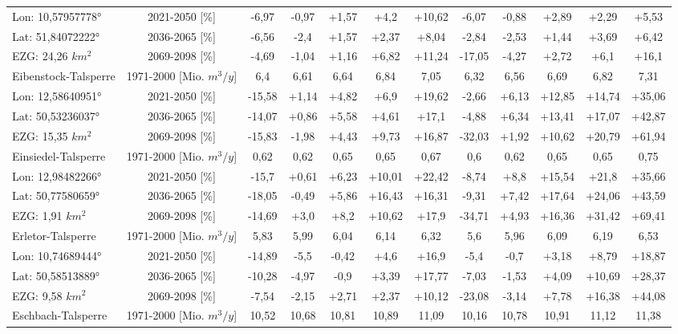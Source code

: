 \begin{longtable}{@{\extracolsep{\fill}}lc|ccccc||ccccc}
\cline{2-12} 
Lon: 10,57957778° & 2021-2050 [\%]  & -6,97 & -0,97 & +1,57 & +4,2 & +10,62 & -6,07 & -0,88 & +2,89 & +2,29 & +5,53\\ 
Lat: 51,84072222° & 2036-2065 [\%]  & -6,56 & -2,4 & +1,57 & +2,37 & +8,04 & -2,84 & -2,53 & +1,44 & +3,69 & +6,42\\ 
EZG: 24,26 $km^2$ & 2069-2098 [\%]  & -4,69 & -1,04 & +1,16 & +6,82 & +11,24 & -17,05 & -4,27 & +2,72 & +6,1 & +16,1\\ 
\hline 
Eibenstock-Talsperre & 1971-2000 [Mio. $m^3/y$]  & 6,4 & 6,61 & 6,64 & 6,84 & 7,05 & 6,32 & 6,56 & 6,69 & 6,82 & 7,31\\ 
\cline{2-12} 
Lon: 12,58640951° & 2021-2050 [\%]  & -15,58 & +1,14 & +4,82 & +6,9 & +19,62 & -2,66 & +6,13 & +12,85 & +14,74 & +35,06\\ 
Lat: 50,53236037° & 2036-2065 [\%]  & -14,07 & +0,86 & +5,58 & +4,61 & +17,1 & -4,88 & +6,34 & +13,41 & +17,07 & +42,87\\ 
EZG: 15,35 $km^2$ & 2069-2098 [\%]  & -15,83 & -1,98 & +4,43 & +9,73 & +16,87 & -32,03 & +1,92 & +10,62 & +20,79 & +61,94\\ 
\hline 
Einsiedel-Talsperre & 1971-2000 [Mio. $m^3/y$]  & 0,62 & 0,62 & 0,65 & 0,65 & 0,67 & 0,6 & 0,62 & 0,65 & 0,65 & 0,75\\ 
\cline{2-12} 
Lon: 12,98482266° & 2021-2050 [\%]  & -15,7 & +0,61 & +6,23 & +10,01 & +22,42 & -8,74 & +8,8 & +15,54 & +21,8 & +35,66\\ 
Lat: 50,77580659° & 2036-2065 [\%]  & -18,05 & -0,49 & +5,86 & +16,43 & +16,31 & -9,31 & +7,42 & +17,64 & +24,06 & +43,59\\ 
EZG: 1,91 $km^2$ & 2069-2098 [\%]  & -14,69 & +3,0 & +8,2 & +10,62 & +17,9 & -34,71 & +4,93 & +16,36 & +31,42 & +69,41\\ 
\hline 
Erletor-Talsperre & 1971-2000 [Mio. $m^3/y$]  & 5,83 & 5,99 & 6,04 & 6,14 & 6,32 & 5,6 & 5,96 & 6,09 & 6,19 & 6,53\\ 
\cline{2-12} 
Lon: 10,74689444° & 2021-2050 [\%]  & -14,89 & -5,5 & -0,42 & +4,6 & +16,9 & -5,4 & -0,7 & +3,18 & +8,79 & +18,87\\ 
Lat: 50,58513889° & 2036-2065 [\%]  & -10,28 & -4,97 & -0,9 & +3,39 & +17,77 & -7,03 & -1,53 & +4,09 & +10,69 & +28,37\\ 
EZG: 9,58 $km^2$ & 2069-2098 [\%]  & -7,54 & -2,15 & +2,71 & +2,37 & +10,12 & -23,08 & -3,14 & +7,78 & +16,38 & +44,08\\ 
\hline 
Eschbach-Talsperre & 1971-2000 [Mio. $m^3/y$]  & 10,52 & 10,68 & 10,81 & 10,89 & 11,09 & 10,16 & 10,78 & 10,91 & 11,12 & 11,38\\ 

\end{longtable}
